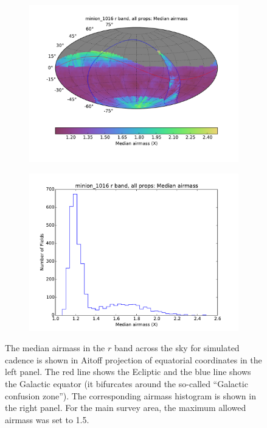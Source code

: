 \begin{figure}[tbh!]
\begin{subfigure}[b]{0.49\textwidth}
\includegraphics[angle=0,width=0.99\hsize,clip]{figs/cadence/minion_1016_Median_airmass_r_band_all_props_OPSI_SkyMap.pdf}
\end{subfigure}
\hfill
\begin{subfigure}[b]{0.49\textwidth}
\includegraphics[angle=0,width=0.99\hsize,clip]{figs/cadence/minion_1016_Median_airmass_r_band_all_props_OPSI_Histogram.pdf}
\end{subfigure}
\caption{The median airmass in the $r$ band across the sky for simulated cadence
 is shown in Aitoff projection of equatorial coordinates
in the left panel. The red line shows the Ecliptic and the blue line shows the Galactic
equator (it bifurcates around the so-called ``Galactic confusion zone''). The corresponding
airmass histogram is shown in the right panel. For the main survey area, the maximum
allowed airmass was set to 1.5. }
\label{fig:airmassenigma}
\end{figure}

